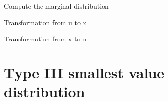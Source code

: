 \documentclass[letterpaper,10pt,english]{sphinxmanual}
\begin{document}
\begin{fulllineitems}
\begin{fulllineitems}
Compute the marginal distribution

\end{fulllineitems}



\begin{fulllineitems}
Transformation from u to x

\end{fulllineitems}



\begin{fulllineitems}
Transformation from x to u

\end{fulllineitems}


\end{fulllineitems}



\section{Type III smallest value distribution}
\label{distributions:type-iii-smallest-value-distribution}
\end{document}
